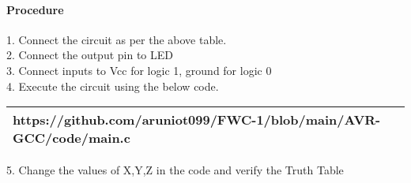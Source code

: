 \documentclass[journal,12pt,twocolumn]{IEEEtran}
\begin{document}
    \paragraph{Procedure}
    
    1. Connect the circuit as per the above table.\\
    2. Connect the output pin to LED\\
    3. Connect inputs to Vcc for logic 1, ground for logic 0\\
    4. Execute the circuit using the below code.\\
   
\begin{tabularx}{0.46\textwidth} { 
  | >{\centering\arraybackslash}X |}
  \hline
  https://github.com/aruniot099/FWC-1/blob/main/AVR-GCC/code/main.c\\
  \hline
\end{tabularx}


5. Change the values of X,Y,Z in the code and verify the Truth Table\\



\end{document}
